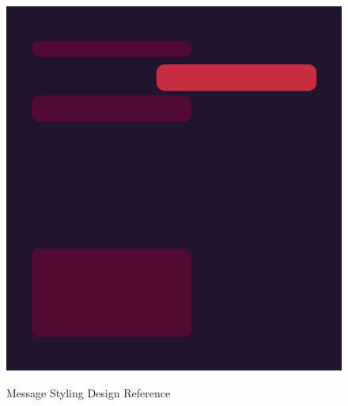 \begin{figure}[H]
    \caption{Message Styling Design Reference}
    \includegraphics[width=1.0\textwidth]{./graphics/messages}\label{fig:figure2}
\end{figure}


